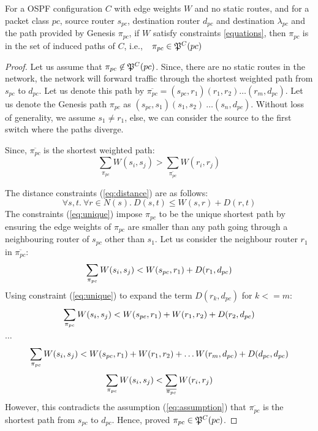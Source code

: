 \begin{theorem}
	For a OSPF configuration $C$ with edge weights $W$ and no 
	static routes, and for a packet class $pc$, source router $s_{pc}$, destination router $d_{pc}$ and destination $\lambda_{pc}$ and the path provided by Genesis $\pi_{pc}$, if $W$ satisfy constraints \cref{equations}, then $\pi_{pc}$ 
	is in the set of induced paths of $C$, i.e., $~~\pi_{pc} \in \mathfrak{P}^C(pc)$
\end{theorem}
\begin{proof}
	Let us assume that $\pi_{pc} \not\in \mathfrak{P}^C(pc)$. Since, there are no
	static routes in the network, the network will forward traffic through
	the shortest weighted path from $s_{pc}$ to $d_{pc}$. Let us denote
	this path by $\overline{\pi_{pc}} = (s_{pc}, r_1)(r_1, r_2)\ldots (r_m, d_{pc})$. 
	Let us denote the Genesis path $\pi_{pc}$ as $(s_{pc}, s_1)(s_1, s_2) \
	\ldots (s_n, d_{pc})$. Without loss of generality, we assume $s_1 \not= r_1$, 
	else, we can consider the source to the first switch where the paths diverge. 
	
	\noindent Since, $\overline{\pi_{pc}}$ is the shortest weighted path:
	\begin{equation} \label{eq:assumption}
	\sum_{\pi_{pc}} W(s_i, s_j) > \sum_{\overline{\pi_{pc}}} W(r_i, r_j)
	\end{equation}
	
The distance constraints (\ref{eq:distance}) are as follows:  
	\[
\forall s, t. ~\forall r \in N(s).~
D(s,t) \leq W(s,r) + D(r,t)
\]
The constraints (\ref{eq:unique}) impose $\pi_{pc}$ to be the
unique shortest path by ensuring the edge weights of $\pi_{pc}$
are smaller than any path going through a neighbouring 
router of $s_{pc}$ other than $s_1$. Let us consider the 
neighbour router $r_1$ in $\overline{\pi_{pc}}$:
\[
	\sum_{\mathclap{\substack{\pi_{pc}}}} 
	W(s_i,s_j) < W(s_{pc}, r_1)+ D(r_1, d_{pc})
\]
Using constraint (\ref{eq:unique}) to expand the term $D(r_k, d_{pc})$ for $k <= m$: 
\[
\sum_{\mathclap{\substack{\pi_{pc}}}} 
W(s_i,s_j) < W(s_{pc}, r_1)+ W(r_1, r_2) + D(r_2, d_{pc})
\] 
\begin{center}
$\ldots$
\end{center}
\[
\sum_{\mathclap{\substack{\pi_{pc}}}} 
W(s_i,s_j) < W(s_{pc}, r_1)+ W(r_1, r_2) + \ldots W(r_{m}, d_{pc}) + D(d_{pc}, d_{pc})
\] 
\[
\sum_{\mathclap{\substack{\pi_{pc}}}} 
W(s_i,s_j) < 
\sum_{\mathclap{\substack{\overline{\pi_{pc}}}}} 
W(r_i,r_j)
\]
However, this contradicts the assumption (\ref{eq:assumption}) that 
$\overline{\pi_{pc}}$ is the shortest path from $s_{pc}$ to $d_{pc}$. Hence, proved 
$\pi_{pc} \in \mathfrak{P}^C(pc)$.
\end{proof}
